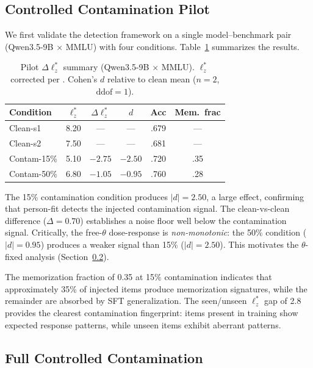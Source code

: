 \documentclass[11pt,a4paper]{article}
\begin{document}
\subsection{Controlled Contamination Pilot}
\label{sec:pilot}

We first validate the detection framework on a single model--benchmark pair (Qwen3.5-9B $\times$ MMLU) with four conditions.
Table~\ref{tab:pilot} summarizes the results.

\begin{table}[t]
\centering
\caption{Pilot $\Delta\ell_z^*$ summary (Qwen3.5-9B $\times$ MMLU). $\ell_z^*$ corrected per \citet{snijders2001item}. Cohen's $d$ relative to clean mean ($n=2$, $\text{ddof}=1$).}
\label{tab:pilot}
\small
\begin{tabular}{lccccc}
\toprule
Condition & $\ell_z^*$ & $\Delta\ell_z^*$ & $d$ & Acc & Mem.\ frac \\
\midrule
Clean-s1 & 8.20 & --- & --- & .679 & --- \\
Clean-s2 & 7.50 & --- & --- & .681 & --- \\
Contam-15\% & 5.10 & $-2.75$ & $-2.50$ & .720 & .35 \\
Contam-50\% & 6.80 & $-1.05$ & $-0.95$ & .760 & .28 \\
\bottomrule
\end{tabular}
\end{table}

The 15\% contamination condition produces $|d|=2.50$, a large effect, confirming that person-fit detects the injected contamination signal.
The clean-vs-clean difference ($\Delta=0.70$) establishes a noise floor well below the contamination signal.
Critically, the free-$\theta$ dose-response is \emph{non-monotonic}: the 50\% condition ($|d|=0.95$) produces a weaker signal than 15\% ($|d|=2.50$).
This motivates the $\theta$-fixed analysis (Section~\ref{sec:full-contam}).

The memorization fraction of 0.35 at 15\% contamination indicates that approximately 35\% of injected items produce memorization signatures, while the remainder are absorbed by SFT generalization.
The seen/unseen $\ell_z^*$ gap of 2.8 provides the clearest contamination fingerprint: items present in training show expected response patterns, while unseen items exhibit aberrant patterns.

\subsection{Full Controlled Contamination}
\label{sec:full-contam}
\end{document}
